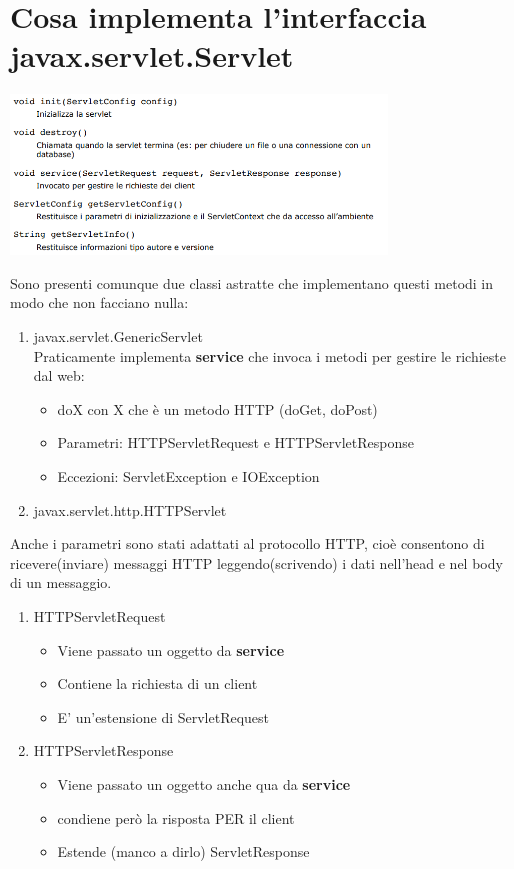 \documentclass[12pt, a4paper, openany, twoside]{book}
\begin{document}
\section{Cosa implementa l'interfaccia javax.servlet.Servlet}
\begin{center}
\includegraphics[width=0.75\textwidth]{6}
\end{center}
Sono presenti comunque due classi astratte che implementano questi metodi
in modo che non facciano nulla:
\begin{enumerate}
	\item javax.servlet.GenericServlet\\
	Praticamente implementa \textbf{service} che invoca i metodi per gestire
	le richieste dal web:
	\begin{itemize}
		\item doX con X che è un metodo HTTP (doGet, doPost)
		\item Parametri: HTTPServletRequest e HTTPServletResponse
		\item Eccezioni: ServletException e IOException
	\end{itemize}
	\item javax.servlet.http.HTTPServlet
\end{enumerate}
Anche i parametri sono stati adattati al protocollo HTTP, cioè consentono di
ricevere(inviare) messaggi HTTP leggendo(scrivendo) i dati nell’head e nel
body di un messaggio.
\begin{enumerate}
	\item HTTPServletRequest
	\begin{itemize}
		\item Viene passato un oggetto da \textbf{service}
		\item Contiene la richiesta di un client
		\item E' un'estensione di ServletRequest
	\end{itemize}
	\item HTTPServletResponse
	\begin{itemize}
		\item Viene passato un oggetto anche qua da \textbf{service}
		\item condiene però la risposta PER il client
		\item Estende (manco a dirlo) ServletResponse
	\end{itemize}
\end{enumerate}
\end{document}
